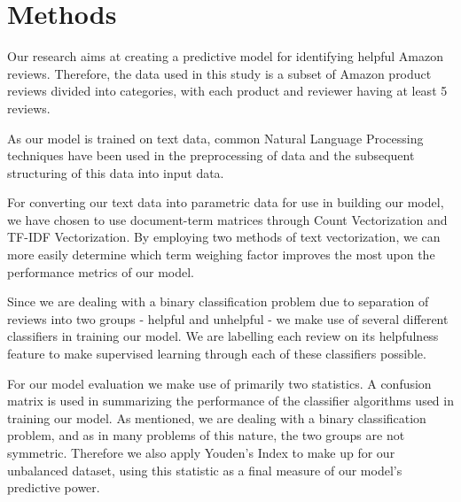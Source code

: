 \documentclass[twoside,twocolumn]{article}
\begin{document}
\section{Methods}
Our research aims at creating a predictive model for identifying helpful Amazon reviews. Therefore, the data used in this study is a subset of Amazon product reviews divided into categories, with each product and reviewer having at least 5 reviews.

As our model is trained on text data, common Natural Language Processing techniques have been used in the preprocessing of data and the subsequent structuring of this data into input data.

For converting our text data into parametric data for use in building our model, we have chosen to use document-term matrices through Count Vectorization and TF-IDF Vectorization. By employing two methods of text vectorization, we can more easily determine which term weighing factor improves the most upon the performance metrics of our model.

Since we are dealing with a binary classification problem due to separation of reviews into two groups - helpful and unhelpful - we make use of several different classifiers in training our model. We are labelling each review on its helpfulness feature to make supervised learning through each of these classifiers possible.

For our model evaluation we make use of primarily two statistics. A confusion matrix is used in summarizing the performance of the classifier algorithms used in training our model. As mentioned, we are dealing with a binary classification problem, and as in many problems of this nature, the two groups are not symmetric. Therefore we also apply Youden's Index to make up for our unbalanced dataset, using this statistic as a final measure of our model's predictive power.

\end{document}
